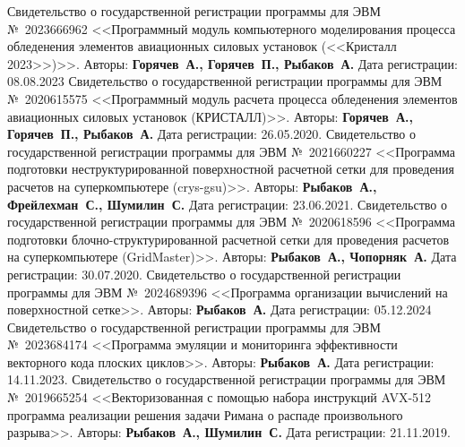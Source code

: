 \begin{thebibliography}{99}
%
Свидетельство о государственной регистрации программы для ЭВМ №~2023666962 <<Программный модуль компьютерного моделирования процесса обледенения элементов авиационных силовых установок (<<Кристалл 2023>>)>>. Авторы: \textbf{Горячев~А., Горячев~П., Рыбаков~А.} Дата регистрации: 08.08.2023
%
Свидетельство о государственной регистрации программы для ЭВМ №~2020615575 <<Программный модуль расчета процесса обледенения элементов авиационных силовых установок (КРИСТАЛЛ)>>. Авторы: \textbf{Горячев~А., Горячев~П., Рыбаков~А.} Дата регистрации: 26.05.2020.
%
Свидетельство о государственной регистрации программы для ЭВМ №~2021660227 <<Программа подготовки неструктурированной поверхностной расчетной сетки для проведения расчетов на суперкомпьютере (crys-gsu)>>. Авторы: \textbf{Рыбаков~А., Фрейлехман~С., Шумилин~С.} Дата регистрации: 23.06.2021.
%
Свидетельство о государственной регистрации программы для ЭВМ №~2020618596 <<Программа подготовки блочно-структурированной расчетной сетки для проведения расчетов на суперкомпьютере (GridMaster)>>. Авторы: \textbf{Рыбаков~А., Чопорняк~А.} Дата регистрации: 30.07.2020.
%
Свидетельство о государственной регистрации программы для ЭВМ №~2024689396 <<Программа организации вычислений на поверхностной сетке>>. Авторы: \textbf{Рыбаков~А.} Дата регистрации: 05.12.2024
%
Свидетельство о государственной регистрации программы для ЭВМ №~2023684174 <<Программа эмуляции и мониторинга эффективности векторного кода плоских циклов>>. Авторы: \textbf{Рыбаков~А.} Дата регистрации: 14.11.2023.
%
Свидетельство о государственной регистрации программы для ЭВМ №~2019665254 <<Векторизованная с помощью набора инструкций AVX-512 программа реализации решения задачи Римана о распаде произвольного разрыва>>. Авторы: \textbf{Рыбаков~А., Шумилин~С.} Дата регистрации: 21.11.2019.
%






%
%







\end{thebibliography}
